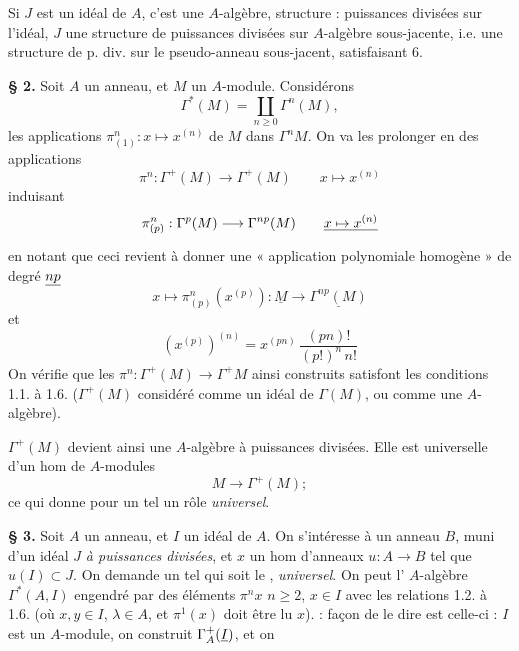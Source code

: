 \documentclass[11pt,a4paper]{article}
\begin{document}
Si $J$ est un idéal de $A$, c'est une $A$-algèbre, \struck{\ill{}}  structure :
puissances divisées sur l'idéal, \struck{\ill{}} $J$ une structure de puissances
divisées sur \struck{\ill{}}  $A$-algèbre sous-jacente, i.e. une structure de
p. div. sur le pseudo-anneau sous-jacent, satisfaisant 6.

\textbf{§ 2.} Soit $A$ un anneau, et $M$ un $A$-module. Considérons
\[
  \Gamma^{*}(M) = \coprod_{n \geqslant 0} \Gamma^{n}(M),
\]
\ill{} les applications $\pi^{n}_{(1)} : x \mapsto x^{(n)}$ de $M$ dans
$\Gamma^{n}M$. On va les prolonger en des applications
\[
  \pi^{n} : \Gamma^{+}(M) \longrightarrow \Gamma^{+}(M) \qquad x \mapsto x^{(n)}
\]
induisant
\[
  \pi^{n}_{(p)} : \Gamma^{p}(M) \longrightarrow \Gamma^{np}(M) \qquad \struck{x \mapsto x^{(n)}}
\]
en notant que ceci revient à donner une « application polynomiale homogène »
de degré $\uncertain{np}$
\[
  x \mapsto \pi^{n}_{(p)}(x^{(p)}) : \underline{M} \longrightarrow \underline{\Gamma^{np}(M)}
\]
et \ill{} 
\[
  (x^{(p)})^{(n)} = x^{(pn)}\, \frac{(pn)!}{(p!)^{n}\, n!}
\]
On vérifie que les $\pi^{n} : \Gamma^{+}(M) \to \Gamma^{+}M$ ainsi
construits satisfont les conditions 1.1. à 1.6. ($\Gamma^{+}(M)$ considéré
comme un idéal de $\Gamma(M)$, ou comme une $A$-algèbre).

$\Gamma^{+}(M)$ devient ainsi une $A$-algèbre à puissances divisées. Elle est
universelle  d'un hom de $A$-modules
\[
  M \longrightarrow \Gamma^{+}(M) ;
\]
ce qui donne pour un tel \ill{} un rôle \emph{universel}.

\textbf{§ 3.} Soit $A$ un anneau, et $I$ un idéal de $A$. On s'intéresse
à un anneau $B$, muni d'un idéal $J$ \emph{à puissances
divisées}, et $x$ un hom d'anneaux $u : A \to B$ tel que
$u(I) \subset J$. On demande un tel  qui
soit le , \emph{universel}. On peut
l'\struck{\ill{}} $A$-algèbre 
$\Gamma^{*}(A, I)$ engendré par des éléments $\pi^{n}x$ 
$n \geqslant 2$, $x \in I$ 
avec les relations 1.2. à 1.6. (où \struck{\ill{}} $x, y \in I$,
$\lambda \in A$, et $\pi^{1}(x)$ doit être lu $x$).   :
façon de le dire est celle-ci : $I$ est un $A$-module,
on construit $\Gamma^{+}_{A}(\uncertain{I})$, et on
\end{document}
